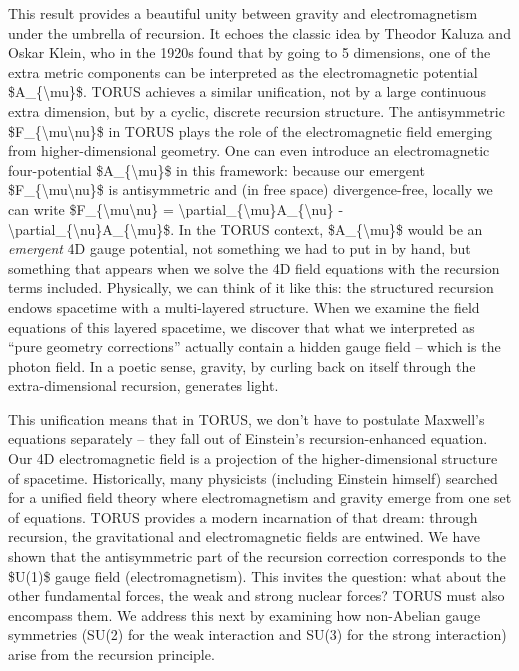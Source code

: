 \documentclass[
]{article}
\begin{document}
This result provides a beautiful unity between gravity and
electromagnetism under the umbrella of recursion. It echoes the classic
idea by Theodor Kaluza and Oskar Klein, who in the 1920s found that by
going to 5 dimensions, one of the extra metric components can be
interpreted as the electromagnetic potential
\$A\_\{\textbackslash mu\}\$. TORUS achieves a similar unification, not
by a large continuous extra dimension, but by a cyclic, discrete
recursion structure. The antisymmetric
\$F\_\{\textbackslash mu\textbackslash nu\}\$ in TORUS plays the role of
the electromagnetic field emerging from higher-dimensional geometry. One
can even introduce an electromagnetic four-potential
\$A\_\{\textbackslash mu\}\$ in this framework: because our emergent
\$F\_\{\textbackslash mu\textbackslash nu\}\$ is antisymmetric and (in
free space) divergence-free, locally we can write
\$F\_\{\textbackslash mu\textbackslash nu\} =
\textbackslash partial\_\{\textbackslash mu\}A\_\{\textbackslash nu\} -
\textbackslash partial\_\{\textbackslash nu\}A\_\{\textbackslash mu\}\$.
In the TORUS context, \$A\_\{\textbackslash mu\}\$ would be an
\emph{emergent} 4D gauge potential, not something we had to put in by
hand, but something that appears when we solve the 4D field equations
with the recursion terms included. Physically, we can think of it like
this: the structured recursion endows spacetime with a multi-layered
structure. When we examine the field equations of this layered
spacetime, we discover that what we interpreted as ``pure geometry
corrections'' actually contain a hidden gauge field -- which is the
photon field. In a poetic sense, gravity, by curling back on itself
through the extra-dimensional recursion, generates light.

This unification means that in TORUS, we don't have to postulate
Maxwell's equations separately -- they fall out of Einstein's
recursion-enhanced equation. Our 4D electromagnetic field is a
projection of the higher-dimensional structure of spacetime.
Historically, many physicists (including Einstein himself) searched for
a unified field theory where electromagnetism and gravity emerge from
one set of equations. TORUS provides a modern incarnation of that dream:
through recursion, the gravitational and electromagnetic fields are
entwined. We have shown that the antisymmetric part of the recursion
correction corresponds to the \$U(1)\$ gauge field (electromagnetism).
This invites the question: what about the other fundamental forces, the
weak and strong nuclear forces? TORUS must also encompass them. We
address this next by examining how non-Abelian gauge symmetries (SU(2)
for the weak interaction and SU(3) for the strong interaction) arise
from the recursion principle.
\end{document}
